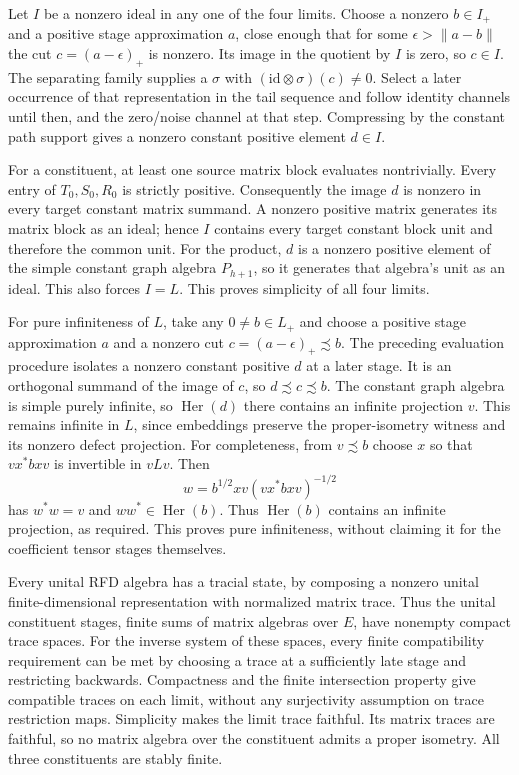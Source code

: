 \documentclass[11pt]{article}
\theoremstyle{remark}\newtheorem{remark}[theorem]{Remark}
\newcommand{\Her}{\operatorname{Her}}\newcommand{\id}{\mathrm{id}}
\begin{document}
Let $I$ be a nonzero ideal in any one of the four limits. Choose a
nonzero $b\in I_+$ and a positive stage approximation $a$, close enough
that for some $\epsilon>\|a-b\|$ the cut
$c=(a-\epsilon)_+$ is nonzero. Its image in the quotient by $I$ is zero,
so $c\in I$. The separating family supplies a $\sigma$ with
$(\id\otimes\sigma)(c)\ne0$. Select a later occurrence of that
representation in the tail sequence and follow identity channels until
then, and the zero/noise channel at that step. Compressing by the
constant path support gives a nonzero constant positive element $d\in I$.

For a constituent, at least one source matrix block evaluates nontrivially.
Every entry of $T_0,S_0,R_0$ is strictly positive. Consequently the
image $d$ is nonzero in every target constant matrix summand. A nonzero
positive matrix generates its matrix block as an ideal; hence $I$
contains every target constant block unit and therefore the common unit.
For the product, $d$ is a nonzero positive element of the simple constant
graph algebra $P_{h+1}$, so it generates that algebra's unit as an ideal.
This also forces $I=L$. This proves simplicity of all four limits.

For pure infiniteness of $L$, take any $0\ne b\in L_+$ and choose a
positive stage approximation $a$ and a nonzero cut
$c=(a-\epsilon)_+\precsim b$. The preceding evaluation procedure isolates
a nonzero constant positive $d$ at a later stage. It is an orthogonal
summand of the image of $c$, so $d\precsim c\precsim b$. The constant
graph algebra is simple purely infinite, so $\Her(d)$ there contains an
infinite projection $v$. This remains infinite in $L$, since embeddings
preserve the proper-isometry witness and its nonzero defect projection.
For completeness, from $v\precsim b$ choose $x$ so that $vx^*bxv$ is
invertible in $vLv$. Then
\[
         w=b^{1/2}xv(vx^*bxv)^{-1/2}
\]
has $w^*w=v$ and $ww^*\in\Her(b)$. Thus $\Her(b)$ contains an infinite
projection, as required. This proves pure infiniteness, without claiming
it for the coefficient tensor stages themselves.

Every unital RFD algebra has a tracial state, by composing a nonzero
unital finite-dimensional representation with normalized matrix trace.
Thus the unital constituent stages, finite sums of matrix algebras over
$E$, have nonempty compact trace spaces. For the inverse system of these
spaces, every finite compatibility requirement can be met by choosing a
trace at a sufficiently late stage and restricting backwards. Compactness
and the finite intersection property give compatible traces on each
limit, without any surjectivity assumption on trace restriction maps.
Simplicity makes the limit trace faithful. Its matrix traces are faithful,
so no matrix algebra over the constituent admits a proper isometry.
All three constituents are stably finite.
\end{document}
